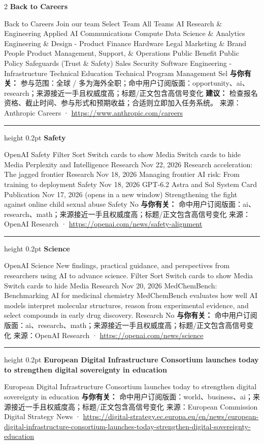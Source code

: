 \documentclass[10.5pt]{ctexart}
\begin{document}
\begin{multicols}{2}
{\large\bfseries Back to Careers}\par
Back to Careers Join our team Select Team All Teams AI Research \& Engineering Applied AI Communications Compute Data Science \& Analytics Engineering \& Design - Product Finance Hardware Legal Marketing \& Brand People Product Management, Support, \& Operations Public Benefit Public Policy Safeguards (Trust \& Safety) Sales Security Software Engineering - Infrastructure Technical Education Technical Program Management Sel
\textbf{与你有关：} 参与范围：全球 / 多为海外全职；命中用户订阅版面：opportunity、ai、research；来源接近一手且权威度高；标题/正文包含高信号变化
\textbf{建议：} 检查报名资格、截止时间、参与形式和预期收益；合适则立即加入任务系统。
{\footnotesize\color{ormuted} 来源：Anthropic Careers · \url{https://www.anthropic.com/careers}}
\vspace{2mm}
\hrule height 0.2pt
\vspace{2mm}
{\large\bfseries Safety}\par
OpenAI Safety Filter Sort Switch cards to show Media Switch cards to hide Media Perplexity and Intelligence Research Nov 22, 2026 Research acceleration: The jagged frontier Research Nov 18, 2026 Managing frontier AI risk: From training to deployment Safety Nov 18, 2026 GPT‑6.2 Astra and Sol System Card Publication Nov 17, 2026 (opens in a new window) Strengthening the fight against online child sexual abuse Safety No
\textbf{与你有关：} 命中用户订阅版面：ai、research、math；来源接近一手且权威度高；标题/正文包含高信号变化
{\footnotesize\color{ormuted} 来源：OpenAI Research · \url{https://openai.com/news/safety-alignment}}
\vspace{2mm}
\hrule height 0.2pt
\vspace{2mm}
{\large\bfseries Science}\par
OpenAI Science New findings, practical guidance, and perspectives from researchers using AI to advance science. Filter Sort Switch cards to show Media Switch cards to hide Media Research Nov 20, 2026 MedChemBench: Benchmarking AI for medicinal chemistry MedChemBench evaluates how well AI models interpret molecular structures, reason from experimental evidence, and select compounds in early drug discovery. Research No
\textbf{与你有关：} 命中用户订阅版面：ai、research、math；来源接近一手且权威度高；标题/正文包含高信号变化
{\footnotesize\color{ormuted} 来源：OpenAI Research · \url{https://openai.com/news/science}}
\vspace{2mm}
\hrule height 0.2pt
\vspace{2mm}
{\large\bfseries European Digital Infrastructure Consortium launches today to strengthen digital sovereignty in education}\par
European Digital Infrastructure Consortium launches today to strengthen digital sovereignty in education
\textbf{与你有关：} 命中用户订阅版面：world、business、ai；来源接近一手且权威度高；标题/正文包含高信号变化
{\footnotesize\color{ormuted} 来源：European Commission Digital Strategy News · \url{https://digital-strategy.ec.europa.eu/en/news/european-digital-infrastructure-consortium-launches-today-strengthen-digital-sovereignty-education}}
\end{multicols}
\end{document}

